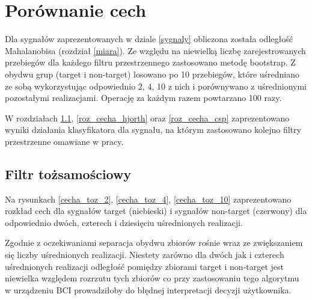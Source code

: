 \documentclass[licencjacka,openright]{pracamgr}
\begin{document}
\FloatBarrier
\section{Porównanie cech}
\label{porownanie_cech}
Dla sygnałów zaprezentowanych w dziale \ref{sygnaly} obliczona została odległość Mahalanobisa (rozdział \ref{miara}). Ze względu na niewielką liczbę zarejestrowanych przebiegów dla każdego filtru przestrzennego zastosowano metodę bootstrap. Z obydwu grup (target i non-target) losowano po 10 przebiegów, które uśredniano ze sobą wykorzystując odpowiednio 2, 4, 10 z nich i porównywano z uśrednionymi pozostałymi realizacjami. Operację za każdym razem powtarzano 100 razy.

W rozdziałach \ref{roz_cecha_toz}, \ref{roz_cecha_hjorth} oraz \ref{roz_cecha_csp} zaprezentowano wyniki działania klasyfikatora dla sygnału, na którym zastosowano kolejno filtry przestrzenne omawiane w pracy.

\subsection{Filtr tożsamościowy}
\label{roz_cecha_toz}
Na rysunkach \ref{cecha_toz_2}, \ref{cecha_toz_4}, \ref{cecha_toz_10} zaprezentowano rozkład cech dla sygnałów target (niebieski) i sygnałów non-target (czerwony) dla odpowiednio dwóch, czterech i dziesięciu uśrednionych realizacji.

Zgodnie z oczekiwaniami separacja obydwu zbiorów rośnie wraz ze zwiększaniem się liczby uśrednionych realizacji. Niestety zarówno dla dwóch jak i czterech uśrednionych realizacji odległość pomiędzy zbiorami target i non-target jest niewielka względem rozrzutu tych zbiorów co przy zastosowaniu tego algorytmu w urządzeniu BCI prowadziłoby do błędnej interpretacji decyzji użytkownika.


\end{document}
